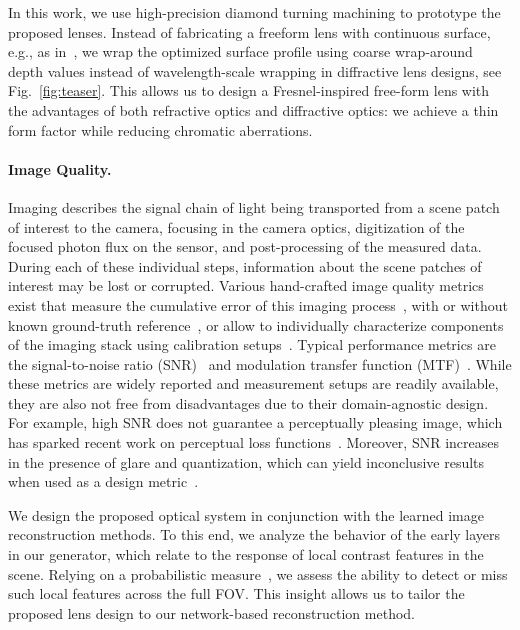 In this work, we use high-precision diamond turning machining to prototype 
the proposed lenses. Instead of fabricating a 
freeform lens with continuous surface, e.g., as in~\cite{sitzmann2018end}, we wrap the optimized 
surface profile using coarse wrap-around depth values instead of wavelength-scale wrapping in diffractive lens designs, see Fig.~\ref{fig:teaser}. This allows us to design a Fresnel-inspired free-form lens with the advantages of both refractive optics and 
diffractive optics: we achieve a thin form factor while reducing chromatic aberrations.

\paragraph{Image Quality.}
Imaging describes the signal chain of light being transported from a scene patch of interest to the camera, focusing in the camera optics, digitization of the focused photon flux on the sensor, and post-processing of the measured data. During each of these individual steps, information about the scene patches of interest may be lost or corrupted. Various hand-crafted image quality metrics exist that measure the cumulative error of this imaging process~\cite{wang2004image,mitra2014denoise}, with or without known ground-truth reference~\cite{mittal2012no}, or allow to individually characterize components of the imaging stack using calibration setups~\cite{estribeau2004fast,emva1288}. Typical performance metrics are the signal-to-noise ratio 
(SNR)~\cite{parker2010algorithms} and modulation transfer function (MTF)~\cite{boreman2001modulation,estribeau2004fast}. While these metrics are widely reported and measurement setups are readily available, they are also not free from disadvantages due to their domain-agnostic design. For example, high SNR does not guarantee a perceptually pleasing image, which has sparked recent work on perceptual loss functions~\cite{johnson2016perceptual}. Moreover, SNR increases in the presence of glare and quantization, which can yield inconclusive results when used as a design metric~\cite{Geese_CDP}.

We design the proposed optical system in conjunction with the learned image reconstruction methods. To this end, we analyze the behavior of the early layers in our generator, which relate to the response of local contrast features in the scene. Relying on a probabilistic measure~\cite{Geese_CDP}, we assess the ability to detect or miss such local features across the full FOV.  This insight allows us  to tailor the proposed lens design to our network-based reconstruction method. 
 

